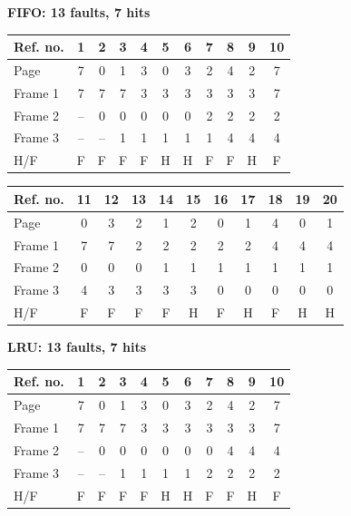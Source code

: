 \noindent\textbf{FIFO: 13 faults, 7 hits}
{\setlength{\tabcolsep}{5pt}\begin{center}\renewcommand{\arraystretch}{1.15}\begin{tabular}{l|cccccccccc}
Ref. no. & 1 & 2 & 3 & 4 & 5 & 6 & 7 & 8 & 9 & 10\\\hline
Page & 7 & 0 & 1 & 3 & 0 & 3 & 2 & 4 & 2 & 7\\
Frame 1 & 7 & 7 & 7 & 3 & 3 & 3 & 3 & 3 & 3 & 7\\
Frame 2 & -- & 0 & 0 & 0 & 0 & 0 & 2 & 2 & 2 & 2\\
Frame 3 & -- & -- & 1 & 1 & 1 & 1 & 1 & 4 & 4 & 4\\
H/F & F & F & F & F & H & H & F & F & H & F\\
\end{tabular}\end{center}}
{\setlength{\tabcolsep}{5pt}\begin{center}\renewcommand{\arraystretch}{1.15}\begin{tabular}{l|cccccccccc}
Ref. no. & 11 & 12 & 13 & 14 & 15 & 16 & 17 & 18 & 19 & 20\\\hline
Page & 0 & 3 & 2 & 1 & 2 & 0 & 1 & 4 & 0 & 1\\
Frame 1 & 7 & 7 & 2 & 2 & 2 & 2 & 2 & 4 & 4 & 4\\
Frame 2 & 0 & 0 & 0 & 1 & 1 & 1 & 1 & 1 & 1 & 1\\
Frame 3 & 4 & 3 & 3 & 3 & 3 & 0 & 0 & 0 & 0 & 0\\
H/F & F & F & F & F & H & F & H & F & H & H\\
\end{tabular}\end{center}}
\noindent\textbf{LRU: 13 faults, 7 hits}
{\setlength{\tabcolsep}{5pt}\begin{center}\renewcommand{\arraystretch}{1.15}\begin{tabular}{l|cccccccccc}
Ref. no. & 1 & 2 & 3 & 4 & 5 & 6 & 7 & 8 & 9 & 10\\\hline
Page & 7 & 0 & 1 & 3 & 0 & 3 & 2 & 4 & 2 & 7\\
Frame 1 & 7 & 7 & 7 & 3 & 3 & 3 & 3 & 3 & 3 & 7\\
Frame 2 & -- & 0 & 0 & 0 & 0 & 0 & 0 & 4 & 4 & 4\\
Frame 3 & -- & -- & 1 & 1 & 1 & 1 & 2 & 2 & 2 & 2\\
H/F & F & F & F & F & H & H & F & F & H & F\\
\end{tabular}\end{center}}
